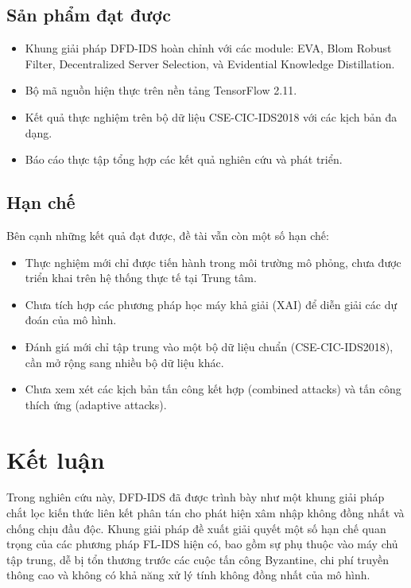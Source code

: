 \subsection{Sản phẩm đạt được}
\begin{itemize}
    \item Khung giải pháp DFD-IDS hoàn chỉnh với các module: EVA, Blom Robust Filter, Decentralized Server Selection, và Evidential Knowledge Distillation.
    \item Bộ mã nguồn hiện thực trên nền tảng TensorFlow 2.11.
    \item Kết quả thực nghiệm trên bộ dữ liệu CSE-CIC-IDS2018 với các kịch bản đa dạng.
    \item Báo cáo thực tập tổng hợp các kết quả nghiên cứu và phát triển.
\end{itemize}

\subsection{Hạn chế}
Bên cạnh những kết quả đạt được, đề tài vẫn còn một số hạn chế:
\begin{itemize}
    \item Thực nghiệm mới chỉ được tiến hành trong môi trường mô phỏng, chưa được triển khai trên hệ thống thực tế tại Trung tâm.
    \item Chưa tích hợp các phương pháp học máy khả giải (XAI) để diễn giải các dự đoán của mô hình.
    \item Đánh giá mới chỉ tập trung vào một bộ dữ liệu chuẩn (CSE-CIC-IDS2018), cần mở rộng sang nhiều bộ dữ liệu khác.
    \item Chưa xem xét các kịch bản tấn công kết hợp (combined attacks) và tấn công thích ứng (adaptive attacks).
\end{itemize}

\section{Kết luận}
\label{sec:conclusion}

Trong nghiên cứu này, DFD-IDS đã được trình bày như một khung giải pháp chắt lọc kiến thức liên kết phân tán cho phát hiện xâm nhập không đồng nhất và chống chịu đầu độc. Khung giải pháp đề xuất giải quyết một số hạn chế quan trọng của các phương pháp FL-IDS hiện có, bao gồm sự phụ thuộc vào máy chủ tập trung, dễ bị tổn thương trước các cuộc tấn công Byzantine, chi phí truyền thông cao và không có khả năng xử lý tính không đồng nhất của mô hình.

